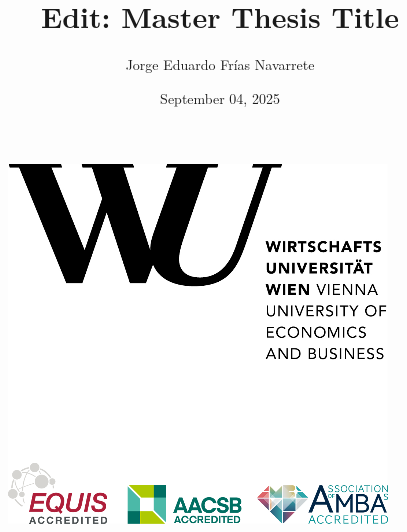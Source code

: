 \documentclass[
  12pt,
  a4paper,
  openany]{scrbook}
\title{Edit: Master Thesis Title}
\author{Jorge Eduardo Frías Navarrete}
\date{September 04, 2025}
\begin{document}
\frontmatter


\thispagestyle{empty}
\begin{figure}[h!]
    \raggedleft
    \includegraphics[scale=0.9]{pictures/WULogo.png}
\end{figure}

\vspace{1em}
\end{document}
